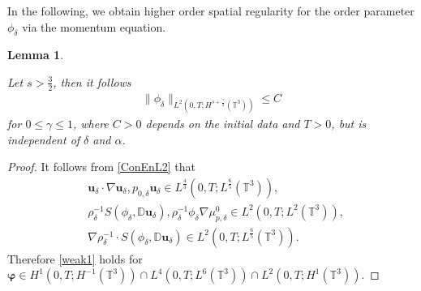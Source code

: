 \documentclass[reqno,a4paper,11pt]{amsart}
\theoremstyle{plain}
\newtheorem{lemma}[theorem]{Lemma}
\numberwithin{equation}{section}
\begin{document}
			In the following, we obtain higher order spatial regularity for the order parameter $\phi_\delta$ via the momentum equation.
			\begin{lemma}\label{lem:higher eatimate}
				
				Let $s>\frac{3}{2}$, then it follows
				\begin{align*}
					\|\phi_\delta\|_{L^{2}(0,T;H^{s+\frac{\gamma}{2}}(\mathbb{T}^{3}))}
					\leq C
				\end{align*}
				for  $0\leq\gamma\leq 1$, where $C>0$ depends on the initial data and $ T> 0$, but is independent of $\delta$ and $\alpha$.
			\end{lemma}
			\begin{proof}
				
				It follows from \eqref{ConEnL2} that
				\begin{align*}
					&\mathbf{u}_\delta\cdot\nabla\mathbf{u}_\delta, p_{0,\delta} \mathbf{u}_\delta\in L^\frac{4}{3}(0,T;L^{\frac{6}{5}}(\mathbb{T}^3)),
					\\& \rho_\delta^{-1}S(\phi_{\delta},\mathbb{ D}\mathbf{u}_\delta),\rho_\delta^{-1}\phi_\delta \nabla \mu_{p,\delta}^{0}\in L^2(0,T;L^{2}(\mathbb{T}^3)),
					\\& \nabla\rho_\delta^{-1}\cdot S(\phi_\delta,\mathbb{ D}\mathbf{u}_\delta)\in L^2(0,T;L^{\frac{6}{5}}(\mathbb{T}^3)).
				\end{align*}
				Therefore  \eqref{weak1} holds for  $\boldsymbol{\varphi}\in  H^1(0,T;H^{-1}(\mathbb{T}^3))\cap L^4(0,T;L^{6}(\mathbb{T}^3))\cap L^2(0,T;H^{1}(\mathbb{T}^3))$.
				

\end{proof}
\end{document}
